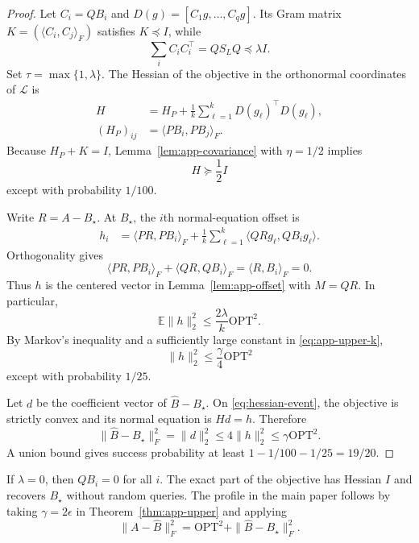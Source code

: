 \documentclass[twoside]{article}
\newcommand{\E}{\mathbb E}
\newcommand{\cL}{\mathcal L}
\newcommand{\OPT}{\mathrm{OPT}}
\begin{document}
\begin{proof}
Let $C_i=QB_i$ and $D(g)=[C_1g,\ldots,C_qg]$. Its Gram matrix
$K=(\langle C_i,C_j\rangle_F)$ satisfies $K\preceq I$, while
\[
 \sum_iC_iC_i^\top=QS_LQ\preceq\lambda I.
\]
Set $\tau=\max\{1,\lambda\}$. The Hessian of the objective in the
orthonormal coordinates of $\cL$ is
\begin{align*}
 H&=H_P+\frac1k\sum_{\ell=1}^kD(g_\ell)^\top D(g_\ell),\\
 (H_P)_{ij}&=\langle PB_i,PB_j\rangle_F.
\end{align*}
Because $H_P+K=I$, Lemma~\ref{lem:app-covariance} with $\eta=1/2$ implies
\begin{equation}
 H\succeq\frac12I
 \label{eq:hessian-event}
\end{equation}
except with probability $1/100$.

Write $R=A-B_\star$. At $B_\star$, the $i$th normal-equation offset is
\begin{align*}
 h_i
 &=\langle PR,PB_i\rangle_F
 +\frac1k\sum_{\ell=1}^k
 \langle QRg_\ell,QB_ig_\ell\rangle.
\end{align*}
Orthogonality gives
\[
 \langle PR,PB_i\rangle_F+\langle QR,QB_i\rangle_F
 =\langle R,B_i\rangle_F=0.
\]
Thus $h$ is the centered vector in Lemma~\ref{lem:app-offset} with $M=QR$.
In particular,
\begin{equation}
 \E\|h\|_2^2\le\frac{2\lambda}{k}\OPT^2.
 \label{eq:h-bound}
\end{equation}
By Markov's inequality and a sufficiently large constant in
\eqref{eq:app-upper-k},
\begin{equation}
 \|h\|_2^2\le\frac\gamma4\OPT^2
 \label{eq:offset-event}
\end{equation}
except with probability $1/25$.

Let $d$ be the coefficient vector of $\widehat B-B_\star$. On
\eqref{eq:hessian-event}, the objective is strictly convex and its normal
equation is $Hd=h$. Therefore
\[
 \|\widehat B-B_\star\|_F^2=\|d\|_2^2
 \le4\|h\|_2^2\le\gamma\OPT^2.
\]
A union bound gives success probability at least
$1-1/100-1/25=19/20$.
\end{proof}

If $\lambda=0$, then $QB_i=0$ for all $i$. The exact part of the objective
has Hessian $I$ and recovers $B_\star$ without random queries. The profile in
the main paper follows by taking $\gamma=2\epsilon$ in
Theorem~\ref{thm:app-upper} and applying
\[
 \|A-\widehat B\|_F^2
 =\OPT^2+\|\widehat B-B_\star\|_F^2.
\]
\end{document}
